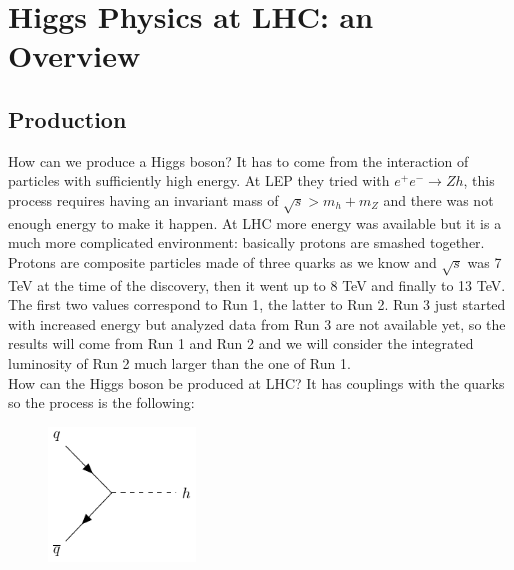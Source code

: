 \documentclass[../main.tex]{subfiles}
\begin{document}
\section{Higgs Physics at LHC: an Overview}
\subsection{Production}
How can we produce a Higgs boson? It has to come from the interaction of particles with sufficiently high energy. At LEP they tried with $e^+e^-\to Zh$,
this process requires having an invariant mass of $\sqrt{s}>m_h+m_Z$ and there was not enough energy to make it happen. At LHC more energy was available but it is a much more complicated environment: basically protons are smashed together. Protons are composite particles made of three quarks as we know and $\sqrt{s}$ was 7 TeV at the time of the discovery, then it went up to 8 TeV and finally to 13 TeV. The first two values correspond to Run 1, the latter to Run 2. Run 3 just started with increased energy but analyzed data from Run 3 are not available yet, so the results will come from Run 1 and Run 2 and we will consider the integrated luminosity of Run 2 much larger than the one of Run 1.\\
How can the Higgs boson be produced at LHC? It has couplings with the quarks so the process is the following:
\begin{figure}[h]
    \centering
    \includegraphics[width=0.35\textwidth]{Images/qqhiggs.pdf}
    \caption*{}
\end{figure}
\end{document}
